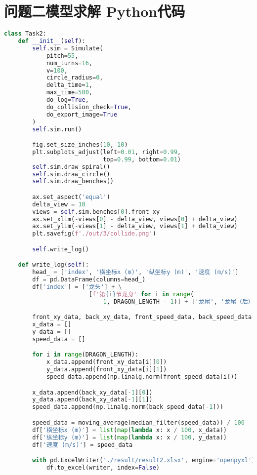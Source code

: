 \section{问题二模型求解 Python代码}

\begin{lstlisting}[language=python]
class Task2:
    def __init__(self):
        self.sim = Simulate(
            pitch=55,
            num_turns=16,
            v=100,
            circle_radius=0,
            delta_time=1,
            max_time=500,
            do_log=True,
            do_collision_check=True,
            do_export_image=True
        )
        self.sim.run()

        fig.set_size_inches(10, 10)
        plt.subplots_adjust(left=0.01, right=0.99,
                            top=0.99, bottom=0.01)
        self.sim.draw_spiral()
        self.sim.draw_circle()
        self.sim.draw_benches()

        ax.set_aspect('equal')
        delta_view = 10
        views = self.sim.benches[0].front_xy
        ax.set_xlim(-views[0] - delta_view, views[0] + delta_view)
        ax.set_ylim(-views[1] - delta_view, views[1] + delta_view)
        plt.savefig(f'./out/3/collide.png')

        self.write_log()

    def write_log(self):
        head_ = ['index', '横坐标x (m)', '纵坐标y (m)', '速度 (m/s)']
        df = pd.DataFrame(columns=head_)
        df['index'] = ['龙头'] + \
                        [f'第{i}节龙身' for i in range(
                            1, DRAGON_LENGTH - 1)] + ['龙尾', '龙尾（后）']

        front_xy_data, back_xy_data, front_speed_data, back_speed_data = self.sim.log[-1]
        x_data = []
        y_data = []
        speed_data = []

        for i in range(DRAGON_LENGTH):
            x_data.append(front_xy_data[i][0])
            y_data.append(front_xy_data[i][1])
            speed_data.append(np.linalg.norm(front_speed_data[i]))

        x_data.append(back_xy_data[-1][0])
        y_data.append(back_xy_data[-1][1])
        speed_data.append(np.linalg.norm(back_speed_data[-1]))

        speed_data = moving_average(median_filter(speed_data)) / 100
        df['横坐标x (m)'] = list(map(lambda x: x / 100, x_data))
        df['纵坐标y (m)'] = list(map(lambda x: x / 100, y_data))
        df['速度 (m/s)'] = speed_data

        with pd.ExcelWriter('./result/result2.xlsx', engine='openpyxl') as writer:
            df.to_excel(writer, index=False)
\end{lstlisting}

